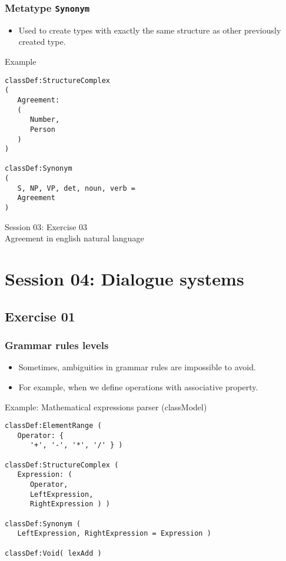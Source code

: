 \documentclass[11pt]{beamer}
\begin{document}
\begin{frame}[fragile]
\frametitle{Metatype \texttt{Synonym}}
\begin{itemize}
	\item Used to create types with exactly the same structure as other previously created type.
\end{itemize}
\pause
{}
\begin{block}{Example}
\scriptsize
\begin{lstlisting}[language=lekta]
classDef:StructureComplex 
(
   Agreement: 
   (
      Number,
      Person
   )
)

classDef:Synonym 
(
   S, NP, VP, det, noun, verb = 
   Agreement 
)
\end{lstlisting}
\end{block}
\end{frame}

\begin{frame}[fragile]
\Huge
\begin{center}
Session 03: Exercise 03\\
Agreement in english natural language
\end{center}
\end{frame}

\section{Session 04: Dialogue systems}

\subsection{Exercise 01}

\begin{frame}[fragile]
\frametitle{Grammar rules levels}
\begin{itemize}
	\item Sometimes, ambiguities in grammar rules are impossible to avoid.
	\pause
	\item For example, when we define operations with associative property.
\end{itemize}
\begin{block}{Example: Mathematical expressions parser (classModel)}
\scriptsize
\begin{lstlisting}[language=lekta]
classDef:ElementRange (
   Operator: {
      '+', '-', '*', '/' } )

classDef:StructureComplex ( 
   Expression: (
      Operator, 
      LeftExpression, 
      RightExpression ) )

classDef:Synonym ( 
   LeftExpression, RightExpression = Expression )

classDef:Void( lexAdd )
\end{lstlisting}
\end{block}
\end{frame}
\end{document}
